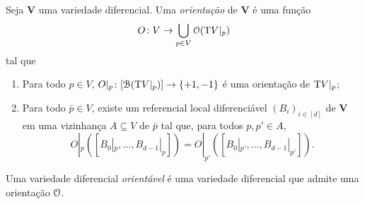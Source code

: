 











\begin{definition}
Seja $\bm V$ uma variedade diferencial. Uma \emph{orientação} de $\bm V$ é uma função
	\begin{equation*}
	O \colon V \to \bigcup_{p \in V} \mathcal{O}(\mathrm{T} V|_p)
	\end{equation*}
tal que
	\begin{enumerate}
	\item Para todo $p \in V$, $O|_p\colon [\mathcal{B}(\mathrm{T} V|_p)] \to \{+1,-1\}$ é uma orientação de $\mathrm{T} V|_p$;
	\item Para todo $\bar p \in V$, existe um referencial local diferenciável $(B_i)_{i \in [d]}$ de $\bm V$ em uma vizinhança $A \subseteq V$ de $\bar p$ tal que, para todos $p,p' \in A$,
	\begin{equation*}
	O|_p([B_0|_p,\ldots,B_{d-1}|_p]) = O|_{p'}([B_0|_{p'},\ldots,B_{d-1}|_{p'}]).
	\end{equation*}
	\end{enumerate}

Uma variedade diferencial \emph{orientável} é uma variedade diferencial que admite uma orientação $\mathcal{O}$.
\end{definition}

